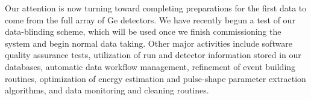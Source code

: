 Our attention is now turning toward completing preparations for the first data to come from the full array of Ge detectors. We have recently begun a test of our data-blinding scheme, which will be used once we finish commissioning the system and begin normal data taking. Other major activities include software quality assurance tests, utilization of run and detector information stored in our databases, automatic data workflow management, refinement of event building routines, optimization of energy estimation and pulse-shape parameter extraction algorithms, and data monitoring and cleaning routines.
